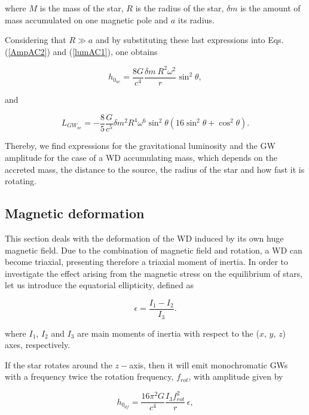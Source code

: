 \documentclass{ws-procs961x669}            %
\begin{document}
\noindent where $M$ is the mass of the star, $R$ is the radius of the star, $\delta m$ is the amount of mass accumulated on one magnetic pole and $a$ its radius.

Considering that $R \gg a$ and by substituting these last expressions into Eqs. (\ref{AmpAC2}) and (\ref{lumAC1}),  one obtains

\begin{equation}
  h_{0_{ac}} = \frac{8G}{c^{4}} \frac{\delta m ~R^{2} \omega ^{2}}{r} \sin ^{2}\theta,
    \label{AmpAC4}
 \end{equation}
 
\noindent and

\begin{equation}
  L_{GW_{ac}} = -\frac{8}{5} \frac{G}{c^{5}} \delta m^{2} R^{4} \omega ^{6} \sin^{2}\theta (16 \sin^{2}\theta + \cos^{2}\theta ).
    \label{lumAC2}
 \end{equation}
 
Thereby, we find expressions for the gravitational luminosity and the GW amplitude for the case of a WD accumulating mass, which depends on the accreted mass, the distance to the source, the radius of the star and how fast it is rotating.


\subsection{Magnetic deformation}

This section deals with the deformation of the WD induced by its own huge magnetic field. Due to the combination of magnetic field and rotation, a WD can become  triaxial, presenting therefore a triaxial moment of inertia. In order to investigate the effect arising from the magnetic stress on the equilibrium of stars, let  us  introduce  the equatorial  ellipticity,  defined as \cite{shapiro/2008,maggiore/2008}

\begin{equation}
  \epsilon = \frac{I_{1} - I_{2}}{I_{3}}.
 \label{elipticidade}
\end{equation}

\noindent where $I_{1}$, $I_{2}$ and $I_{3}$ are main moments of inertia with respect to the ($x$, $y$, $z$) axes, respectively.

If the star rotates around the $z-$axis, then it will emit monochromatic GWs with a frequency twice the rotation frequency, $f_{rot}$, with amplitude given by \cite{shapiro/2008,maggiore/2008}

\begin{equation}
   h_{0_{df}} = \frac{16 \pi^{2} G}{c^{4}}  \frac{I_{3} f_{rot}^{2}}{r} \, \epsilon,
\label{Ampdef2}
\end{equation}
\end{document}
